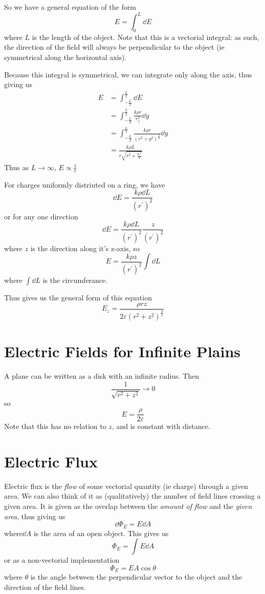 \documentclass[12pt]{article}
\newcommand{\inint}[2]{\int #1 \dd #2}
\begin{document}
So we have a general equation of the form \[ E = \int_0^L \dd E \] where $L$ is the length of the object. Note that this is a vectorial integral: as such, the direction of the field will always be perpendicular to the object (ie symmetrical along the horizontal axis).

Because this integral is symmetrical, we can integrate only along the axis, thus giving us
\begin{align*}
E &= \int_{-\frac{L}{2}}^{\frac{L}{2}} \dd E\\
  &= \int_{-\frac{L}{2}}^{\frac{L}{2}} \frac{k \rho r}{r_1^3} \dd y\\
  &= \int_{-\frac{L}{2}}^{\frac{L}{2}} \frac{k \rho r}{(r^2 + y^2)^{\frac{3}{2}}} \dd y\\
  &= \frac{k \rho L}{r\sqrt{r^2 + \frac{L^2}{4}}}
\end{align*}
Thus as $L \to \infty$, $E \propto \frac{1}{r}$

For charges uniformly distriuted on a ring, we have \[ \dd E = \frac{k \rho \dd L}{(r^\prime)^2} \]
or for any one direction \[ \dd E = \frac{k \rho \dd L}{(r^\prime)^2} \frac{z}{(r^\prime)^2} \] where $z$ is the direction along it's z-axis, so \[ E = \frac{k \rho z}{(r^\prime)^2} \inint{}{L} \] where $\inint{}{L}$ is the circumferance.

Thus gives us the general form of this equation \[ E_z = \frac{\rho rz}{2\varepsilon(r^2 + z^2)^{\frac{3}{2}}} \]

\section*{Electric Fields for Infinite Plains}
A plane can be written as a disk with an infinite radius. Then \[ \frac{1}{\sqrt{r^2 + z^2}} \to 0 \] so \[ E = \frac{\rho}{2\varepsilon} \] Note that this has no relation to $z$, and is constant with distance.

\section*{Electric Flux}
Electric flux is the \emph{flow} of some vectorial quantity (ie charge) through a given area. We can also think of it as (qualitatively) the number of field lines crossing a given area. It is given as the overlap between the \emph{amount of flow} and the \emph{given area}, thus giving us \[ \dd\Phi_E = E \dd A \] where$\dd A$ is the area of an open object. This gives us \[ \Phi_E = \inint{E}{A} \] or as a non-vectorial implementation \[ \Phi_E = EA\cos\theta \] where $\theta$ is the angle between the perpendicular vector to the object and the direction of the field lines.
\end{document}
